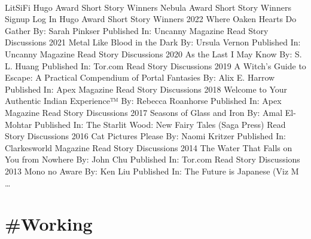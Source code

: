 \documentclass[10pt,a4paper]{article}
\begin{document}
\begin{multicols}{2}
\paragraph{}
LitSiFi
Hugo Award Short Story Winners
Nebula Award Short Story Winners
Signup
Log In
Hugo Award Short Story Winners
2022
Where Oaken Hearts Do Gather
By: Sarah Pinkser
Published In: Uncanny Magazine
Read Story
Discussions
2021
Metal Like Blood in the Dark
By: Ursula Vernon
Published In: Uncanny Magazine
Read Story
Discussions
2020
As the Last I May Know
By: S. L. Huang
Published In: Tor.com
Read Story
Discussions
2019
A Witch's Guide to Escape: A Practical Compendium of Portal Fantasies
By: Alix E. Harrow
Published In: Apex Magazine
Read Story
Discussions
2018
Welcome to Your Authentic Indian Experience™
By: Rebecca Roanhorse
Published In: Apex Magazine
Read Story
Discussions
2017
Seasons of Glass and Iron
By: Amal El-Mohtar
Published In: The Starlit Wood: New Fairy Tales (Saga Press)
Read Story
Discussions
2016
Cat Pictures Please
By: Naomi Kritzer
Published In: Clarkesworld Magazine
Read Story
Discussions
2014
The Water That Falls on You from Nowhere
By: John Chu
Published In: Tor.com
Read Story
Discussions
2013
Mono no Aware
By: Ken Liu
Published In: The Future is Japanese (Viz M
\dots\par
\end{multicols}

\newpage
\section{\#Working}
\end{document}
